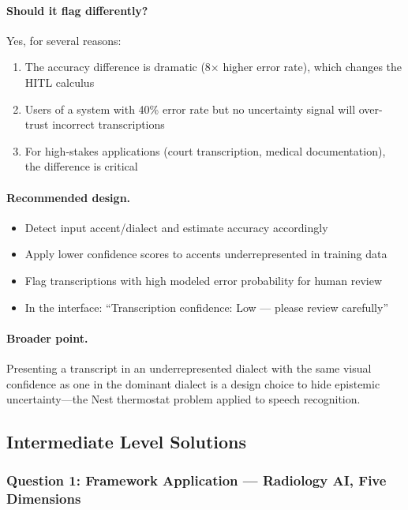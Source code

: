 \paragraph{Should it flag differently?} Yes, for several reasons:

\begin{enumerate}
    \item The accuracy difference is dramatic (8$\times$ higher error rate), which changes the HITL calculus
    \item Users of a system with 40\% error rate but no uncertainty signal will over-trust incorrect transcriptions
    \item For high-stakes applications (court transcription, medical documentation), the difference is critical
\end{enumerate}

\paragraph{Recommended design.}
\begin{itemize}
    \item Detect input accent/dialect and estimate accuracy accordingly
    \item Apply lower confidence scores to accents underrepresented in training data
    \item Flag transcriptions with high modeled error probability for human review
    \item In the interface: ``Transcription confidence: Low --- please review carefully''
\end{itemize}

\paragraph{Broader point.} Presenting a transcript in an underrepresented dialect with the same visual confidence as one in the dominant dialect is a design choice to hide epistemic uncertainty---the Nest thermostat problem applied to speech recognition.

\subsection{Intermediate Level Solutions}

\subsubsection{Question 1: Framework Application --- Radiology AI, Five Dimensions}

